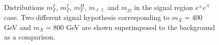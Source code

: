 \begin{figure}[htbp]
\centering
{}
\\
\caption{Distributions  $m_T^I$, $m_T^I$, $m_T^H$, $m_{\ell \ell}$ and $m_{jj}$ in the signal region $e^{\pm} e^{\mp}$ case. Two different signal hypothesis corresponding to $m_X = $400 GeV and $m_X =$800 GeV are shown superimposed to the background as a comparison.}
    \label{fig:mti_sigSFee}
\end{figure}



